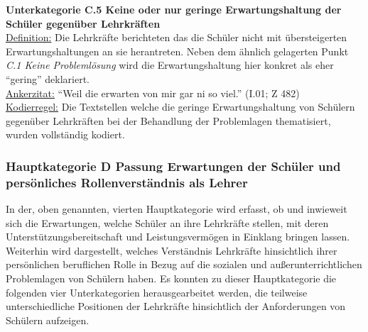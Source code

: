 \textbf{Unterkategorie C.5 Keine oder nur geringe Erwartungshaltung der Schüler gegenüber Lehrkräften}\\
\underline{Definition:} Die Lehrkräfte berichteten das die Schüler nicht mit übersteigerten Erwartungshaltungen an sie herantreten. Neben dem ähnlich gelagerten Punkt \textit{C.1 Keine Problemlösung} wird die Erwartungshaltung hier konkret als eher "`gering"' deklariert.\\
\underline{Ankerzitat:} "`Weil die erwarten von mir gar ni so viel."' (I.01; Z 482)\\
\underline{Kodierregel:} Die Textstellen welche die geringe Erwartungshaltung von Schülern gegenüber Lehrkräften bei der Behandlung der Problemlagen thematisiert, wurden vollständig kodiert.\\

\subsubsection{Hauptkategorie D Passung Erwartungen der Schüler und persönliches Rollenverständnis als Lehrer }
\label{sec:HauptkategorieDPassungErwartungenDerSchülerUndPersönlichesRollenverständnisAlsLehrer}

In der, oben genannten, vierten Hauptkategorie wird erfasst, ob und inwieweit sich die Erwartungen, welche Schüler an ihre Lehrkräfte stellen, mit deren Unterstützungsbereitschaft und Leistungsvermögen in Einklang bringen lassen. Weiterhin wird dargestellt, welches Verständnis Lehrkräfte hinsichtlich ihrer persönlichen beruflichen Rolle in Bezug auf die sozialen und außerunterrichtlichen Problemlagen von Schülern haben. Es konnten zu dieser Hauptkategorie die folgenden vier Unterkategorien herausgearbeitet werden, die teilweise unterschiedliche Positionen der Lehrkräfte hinsichtlich der Anforderungen von Schülern aufzeigen.\\

